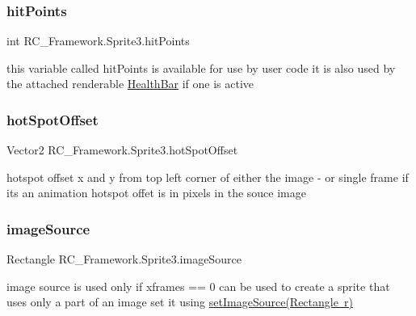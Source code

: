 \subsubsection{\texorpdfstring{hit\+Points}{hitPoints}}
{\footnotesize\ttfamily int R\+C\+\_\+\+Framework.\+Sprite3.\+hit\+Points}



this variable called hit\+Points is available for use by user code it is also used by the attached renderable \mbox{\hyperlink{class_r_c___framework_1_1_health_bar}{Health\+Bar}} if one is active 

\mbox{\label{class_r_c___framework_1_1_sprite3_aeed4e50c73f6bc34f4b9a4dec34c2f8e}} 
\subsubsection{\texorpdfstring{hot\+Spot\+Offset}{hotSpotOffset}}
{\footnotesize\ttfamily Vector2 R\+C\+\_\+\+Framework.\+Sprite3.\+hot\+Spot\+Offset\hspace{0.3cm}{\ttfamily [protected]}}



hotspot offset x and y from top left corner of either the image -\/ or single frame if its an animation hotspot offet is in pixels in the souce image 

\mbox{\label{class_r_c___framework_1_1_sprite3_a17993ffc6fc5f0b2008edb24696d5982}} 
\subsubsection{\texorpdfstring{image\+Source}{imageSource}}
{\footnotesize\ttfamily Rectangle R\+C\+\_\+\+Framework.\+Sprite3.\+image\+Source\hspace{0.3cm}{\ttfamily [protected]}}



image source is used only if xframes == 0 can be used to create a sprite that uses only a part of an image set it using \mbox{\hyperlink{class_r_c___framework_1_1_sprite3_ac73292a1b053056aa28ecae03165c71d}{set\+Image\+Source(\+Rectangle r)}} 


